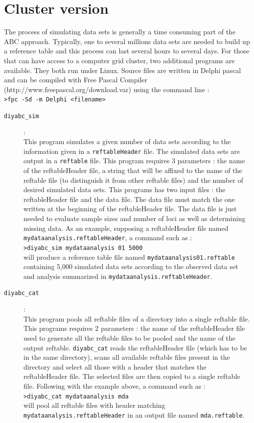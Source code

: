 \clearpage
\section{Cluster version}
The process of simulating data sets is generally a time consuming part of the ABC approach. Typically, one to several millions  data sets are needed to build up a reference table and this process can last several hours to several days. For those  that can have access to a computer grid cluster, two additional programs are available. They both run under Linux. Source files are written in Delphi pascal and can be compiled with Free Pascal Compiler (http://www.freepascal.org/download.var) using the command line :\\
\texttt{>fpc -Sd -m Delphi <filename>}
  \begin{description}
  \item[\texttt{diyabc\_sim}] :\\
  This program simulates a given number of data sets according to the information given in a \texttt{reftableHeader} file. The simulated data sets are output in a \texttt{reftable} file. This program requires 3 parameters : the name of the reftableHeader file, a string that will be affixed to the name of the reftable file (to distinguish it from other reftable files) and the number of desired simulated data sets. This programs has two input files : the reftableHeader file and the data file. The data file must match the one written at the beginning of the reftableHeader file. The data file is just needed to evaluate sample sizes and number of loci as well as determining missing data. As an example, supposing a reftableHeader file named \texttt{mydataanalysis.reftableHeader}, a command such as :\\
  \texttt{>diyabc\_sim mydataanalysis 01 5000}\\
  will produce a reference table file named \texttt{mydataanalysis01.reftable}  containing 5,000 simulated data sets according to the observed data set and analysis summarized in   \texttt{mydataanalysis.reftableHeader}. 
  
  \item[\texttt{diyabc\_cat}]:\\
  This program pools all reftable files of a directory into a single reftable file. This programs requires 2 parameters : the name of the reftableHeader file used to generate all the reftable files to be pooled and the name of the output reftable. \texttt{diyabc\_cat} reads the reftableHeader file (which has to be in the same directory), scans all available reftable files present in the directory and select all those with a header that matches the reftableHeader file.  The selected files are then copied to a single reftable file. Following with the example above, a command such as :\\
  \texttt{>diyabc\_cat mydataanalysis mda}\\
  will pool all reftable files with header matching \texttt{mydataanalysis.reftableHeader} in an output file named \texttt{mda.reftable}. 
  \end{description}
  
